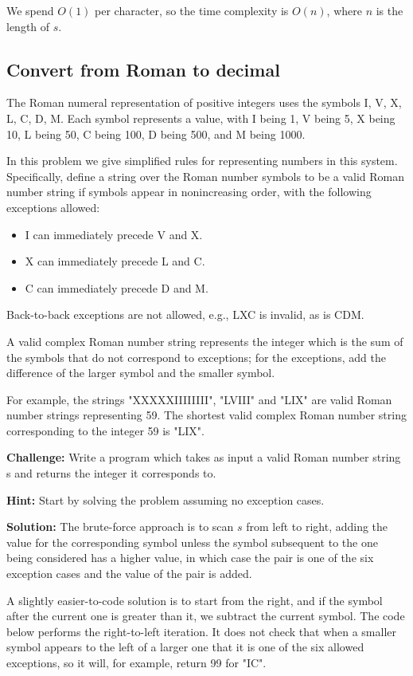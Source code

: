 \documentclass[11pt,a4paper]{article}
\begin{document}
We spend $O(1)$ per character, so the time complexity is $O(n)$, where $n$ is
the length of $s$.

\subsection{Convert from Roman to decimal}

The Roman numeral representation of positive integers uses the symbols I, V,
X, L, C, D, M. Each symbol represents a value, with I being 1, V being 5, X
being 10, L being 50, C being 100, D being 500, and M being 1000.

In this problem we give simplified rules for representing numbers in this
system. Specifically, define a string over the Roman number symbols to be a
valid Roman number string if symbols appear in nonincreasing order, with the
following exceptions allowed:
\begin{itemize}
  \item I can immediately precede V and X. 
  \item X can immediately precede L and C. 
  \item C can immediately precede D and M.
\end{itemize}

Back-to-back exceptions are not allowed, e.g., LXC is invalid, as is CDM.

A valid complex Roman number string represents the integer which is the sum of
the symbols that do not correspond to exceptions; for the exceptions, add the
difference of the larger symbol and the smaller symbol. 

For example, the strings "XXXXXIIIIIIII", "LVIII" and "LIX" are valid Roman
number strings representing 59. The shortest valid complex Roman number string
corresponding to the integer 59 is "LIX".

\textbf{Challenge:} Write a program which takes as input
a valid Roman number string s and returns the integer it corresponds to.

\textbf{Hint:} Start by solving the problem assuming no exception cases.

\textbf{Solution:} The brute-force approach is to scan $s$ from left to right,
adding the value for the corresponding symbol unless the symbol subsequent
to the one being considered has a higher value, in which case the pair is one
of the six exception cases and the value of the pair is added.

A slightly easier-to-code solution is to start from the right, and if the
symbol after the current one is greater than it, we subtract the current
symbol. The code below performs the right-to-left  iteration. It does not
check that when a smaller symbol appears to the left of a larger one that it
is one of the six allowed exceptions, so it will, for example, return 99 for
"IC".
\end{document}
